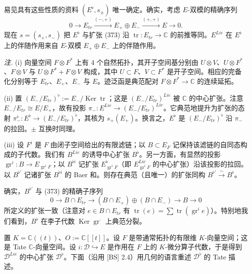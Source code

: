 易见具有这些性质的资料 $(E^{\flat},s_{\pm})$ 唯一确定。确实，考虑 $E$-双模的精确序列
\begin{equation}\tag{373}
0\to E_{tr}\xrightarrow{(-,+)}E_+\oplus E_-\xrightarrow{(+,+)}E\to 0.
\end{equation}
现在 $s=(s_+,s_-)$ 把 $E^{\flat}$ 与扩张 (373) 沿 $\operatorname{tr}:E_{tr}\to\mathbb{C}$ 的前推等同。$E^{Lie}$ 在 $E^{\flat}$ 上的伴随作用来自 $E$-双模 $E_+\oplus E_-$ 上的伴随作用。

\emph{注.} (i) 向量空间 $F\otimes F^{*}$ 上有 4 个自然拓扑，其开子空间基分别由 $U\otimes V$、$U\otimes F^{*}$、$F\otimes V$ 与 $U\otimes F^{*}+F\otimes V$ 构成，其中 $U\subset F$、$V\subset F^{*}$ 是开子空间。相应的完备化分别等于 $E_{tr}$、$E_+$、$E_-$ 与 $E$。迹泛函是典范配对 $F\otimes F^{*}\to\mathbb{C}$ 的连续延拓。

(ii) 置 $(E_-/E_{tr})^{\flat}:=E_-/\operatorname{Ker}\operatorname{tr}$；这是 $(E_-/E_{tr})^{Lie}$ 被 $\mathbb{C}$ 的中心扩张。注意 $E_-/E_{tr}\cong E/E_+$，故有投影 $\pi_-:E^{Lie}\to(E_-/E_{tr})^{Lie}$。它典范地提升为扩张的态射 $\pi^{\flat}_-:E^{\flat}\to(E_-/E_{tr})^{\flat}$，其核为 $s_+(E_+)$。换言之，$E^{\flat}$ 是 $(E_-/E_{tr})^{\flat}$ 沿 $\pi_-$ 的拉回。$\pm$ 互换时同理。

(iii) 设 $F^{i}$ 是 $F$ 由闭子空间给出的有限滤链；以 $B\subset E_{F}$ 记保持该滤链的自同态构成的子代数。我们有%
$B^{Lie}$ 的诱导中心扩张 $B^{\flat}$。另一方面，有显然的投影 $\operatorname{gr}^{i}:B\to E_{\operatorname{gr}^{i}F}$；以 $B^{\flat i}$ 记扩张 $E^{\flat}_{\operatorname{gr}^{i}F}$（即 $E^{Lie}_{\operatorname{gr}^{i}F}$ 的中心扩张）沿该投影的拉回。以 $B^{\flat'}$ 记诸扩张 $B^{\flat i}$ 的 Baer 和。则存在典范（且唯一）的扩张同构 $B^{\flat'}\xrightarrow{\sim}B^{\flat}$。

确实，$B^{\flat'}$ 与 (373) 的精确子序列
\[
0\to B\cap E_{tr}\to(B\cap E_+)\oplus(B\cap E_-)\to B\to 0
\]
所定义的扩张一致（注意对 $e\in B\cap E_{tr}$ 有 $\operatorname{tr}(e)=\sum\operatorname{tr}(\operatorname{gr}^{i}e)$）。特别地我们看到，$B^{\flat}$ 在李子代数 $\operatorname{Ker}\operatorname{gr}^{\cdot}$ 上典范分裂。

 置 $K=\mathbb{C}((t))$、$O:=\mathbb{C}[[t]]$。设 $F$ 是带通常拓扑的有限维 $K$-向量空间；这是 Tate $\mathbb{C}$-向量空间。设 $i:\mathcal{D}\hookrightarrow E$ 是作用在 $F$ 上的 $K$-微分算子代数，于是得到 $\mathcal{D}^{Lie}$ 的中心扩张 $\mathcal{D}^{\flat}$。下面（沿用 [BS] 2.4）用几何的语言重述 $\mathcal{D}^{\flat}$ 的 Tate 描述。

